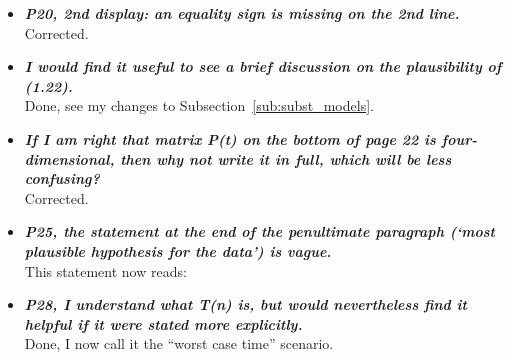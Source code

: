 \documentclass[english]{article}
\begin{document}
\begin{itemize}
\item {
{\it
\textbf{
P20, 2nd display: an equality sign is missing on the 2nd line.
}%
}%
}%
\\
Corrected.

\item {
{\it
\textbf{
I would find it useful to see a brief discussion on the plausibility of (1.22).
}%
}%
}%
\\
Done, see my changes to Subsection~\ref{sub:subst_models}.


\item {
{\it
\textbf{
If I am right that matrix P(t) on the bottom of page 22 is four-dimensional, then why not write it in full, which will be less confusing?
}%
}%
}%
\\
Corrected.




\item {
{\it
\textbf{
P25, the statement at the end of the penultimate paragraph (`most plausible hypothesis for the data') is vague.
}%
}%
}%
\\
This statement now reads:

\begin{quote}
\myeditsveight
\end{quote}









\item {
{\it
\textbf{
P28, I understand what T(n) is, but would nevertheless find it helpful if it were stated more explicitly.
}%
}%
}%
\\
Done, I now call it the ``worst case time'' scenario.



\end{itemize}
\end{document}
